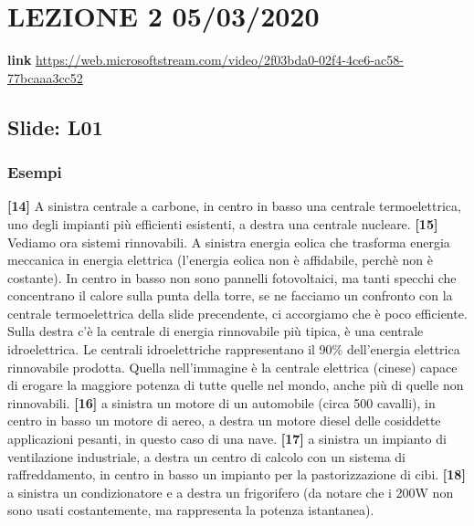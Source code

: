\section*{LEZIONE 2 05/03/2020}
\textbf{link} \url{https://web.microsoftstream.com/video/2f03bda0-02f4-4ce6-ac58-77bcaaa3cc52}
\subsection*{Slide: L01}
\subsubsection*{Esempi}
\textbf{[14]}\; A sinistra centrale a carbone, in centro in basso una centrale termoelettrica, uno degli impianti più efficienti esistenti, a destra una centrale nucleare.\newline
\textbf{[15]}\; Vediamo ora sistemi rinnovabili. A sinistra energia eolica che trasforma energia meccanica in energia elettrica (l'energia eolica non è affidabile, perchè non è costante). In centro in basso non sono pannelli fotovoltaici, ma tanti specchi che concentrano il calore sulla punta della torre, se ne facciamo un confronto con la centrale termoelettrica della slide precendente, ci accorgiamo che è poco efficiente. Sulla destra c'è la centrale di energia rinnovabile più tipica, è una centrale idroelettrica. Le centrali idroelettriche rappresentano il 90\% dell'energia elettrica rinnovabile prodotta. Quella nell'immagine è la centrale elettrica (cinese) capace di erogare la maggiore potenza di tutte quelle nel mondo, anche più di quelle non rinnovabili.\newline
\textbf{[16]}\; a sinistra un motore di un automobile (circa 500 cavalli), in centro in basso un motore di aereo, a destra un motore diesel delle cosiddette applicazioni pesanti, in questo caso di una nave.\newline
\textbf{[17]}\; a sinistra un impianto di ventilazione industriale, a destra un centro di calcolo con un sistema di raffreddamento, in centro in basso un impianto per la pastorizzazione di cibi.\newline
\textbf{[18]}\; a sinistra un condizionatore e a destra un frigorifero (da notare che i 200W non sono usati costantemente, ma rappresenta la potenza istantanea).\newline
